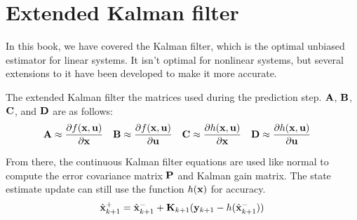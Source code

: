 \section{Extended Kalman filter}
\label{sec:ekf}

In this book, we have covered the Kalman filter, which is the optimal unbiased
estimator for linear \glspl{system}. It isn't optimal for nonlinear
\glspl{system}, but several extensions to it have been developed to make it more
accurate.

The extended Kalman filter  the matrices used
during the prediction step. $\mathbf{A}$, $\mathbf{B}$, $\mathbf{C}$, and $\mathbf{D}$ are
 as follows:
\begin{align*}
  \mathbf{A} &\approx
    \frac{\partial f(\mathbf{x}, \mathbf{u})}{\partial \mathbf{x}} &
  \mathbf{B} &\approx
    \frac{\partial f(\mathbf{x}, \mathbf{u})}{\partial \mathbf{u}} &
  \mathbf{C} &\approx
    \frac{\partial h(\mathbf{x}, \mathbf{u})}{\partial \mathbf{x}} &
  \mathbf{D} &\approx
    \frac{\partial h(\mathbf{x}, \mathbf{u})}{\partial \mathbf{u}}
\end{align*}

From there, the continuous Kalman filter equations are used like normal to
compute the error covariance matrix $\mathbf{P}$ and Kalman gain matrix. The
\gls{state} estimate update can still use the function $h(\mathbf{x})$ for
accuracy.
\begin{equation*}
  \hat{\mathbf{x}}_{k+1}^+ = \hat{\mathbf{x}}_{k+1}^- +
    \mathbf{K}_{k+1}(\mathbf{y}_{k+1} - h(\hat{\mathbf{x}}_{k+1}^-))
\end{equation*}
